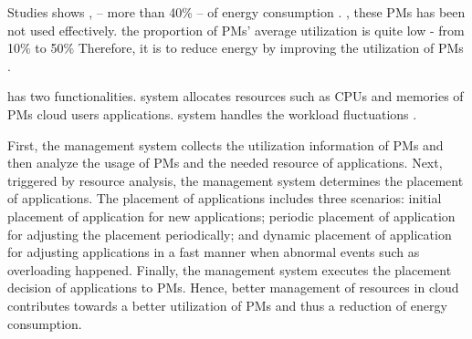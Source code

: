 Studies shows \cite{Barroso:2007jt, Shen:2015hm},   -- more than 40\% -- of energy consumption . ,
these PMs has been not used effectively. the proportion of PMs' average utilization is quite low 
- from 10\% to 50\% \cite{Hameed:2016cmb} 
Therefore, it is  to reduce energy by improving the utilization of PMs .

has two  functionalities.  system 
allocates resources such as CPUs and memories of PMs  cloud users  applications.  system 
handles the workload fluctuations .  

First, the management system collects the utilization information of PMs and then 
analyze the usage of PMs and the needed resource of applications. Next, triggered by resource analysis, the management system determines the 
placement of applications. The placement of applications includes three scenarios: initial placement of application for new applications; periodic placement of application for adjusting the placement periodically; 
and dynamic placement of application for adjusting applications in a fast manner when abnormal events such as overloading happened. Finally, 
the management system executes the placement decision of applications to PMs. Hence, better management of resources 
in cloud contributes towards a better utilization of PMs and thus a reduction of energy consumption.



